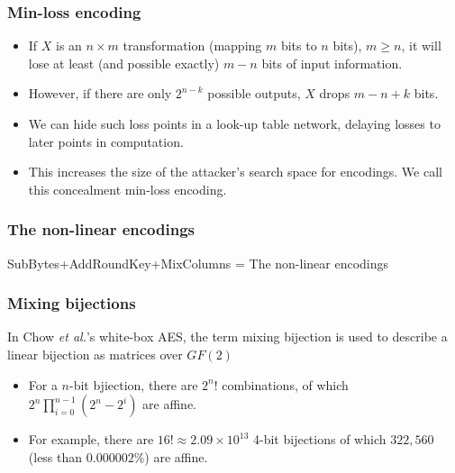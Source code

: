 \documentclass{beamer}
\begin{document}
\frame
{
\frametitle{Min-loss encoding}
\begin{itemize}
\item If $X$ is an $n \times m$ transformation (mapping $m$ bits to $n$ bits), $m \geq n$, it will lose at least (and possible exactly) $m - n$ bits of input information.

\item However, if there are only $2^{n-k}$ possible outputs, $X$ drops $m-n+k$ bits.

\item We can hide such loss points in a look-up table network, delaying losses to later points in computation.

\item This increases the size of the attacker's search space for encodings. We call this concealment \textcolor[rgb]{1.00,0.00,0.00}{min-loss encoding}.
\end{itemize}
}

\frame
{
\frametitle{The non-linear encodings}
SubBytes+AddRoundKey+MixColumns = The non-linear encodings

\begin{figure}[h]
\setcounter{subfigure}{0}
\centering
{}
\end{figure}
}

\frame
{
\frametitle{Mixing bijections}
In Chow \textit{et al.}'s white-box AES, the term \textcolor[rgb]{1.00,0.00,0.00}{mixing bijection} is used to describe a linear bijection as matrices over $GF(2)$

\begin{itemize}
\item For a $n$-bit bjiection, there are $2^{n}!$ combinations, of which $2^{n}\prod^{n-1}_{i=0}(2^{n}-2^{i})$ are affine.

\item For example, there are $16! \approx 2.09 \times 10^{13}$ 4-bit bijections of which $322,560$ (less than $0.000002\%$) are affine.
\end{itemize}
}
\end{document}
